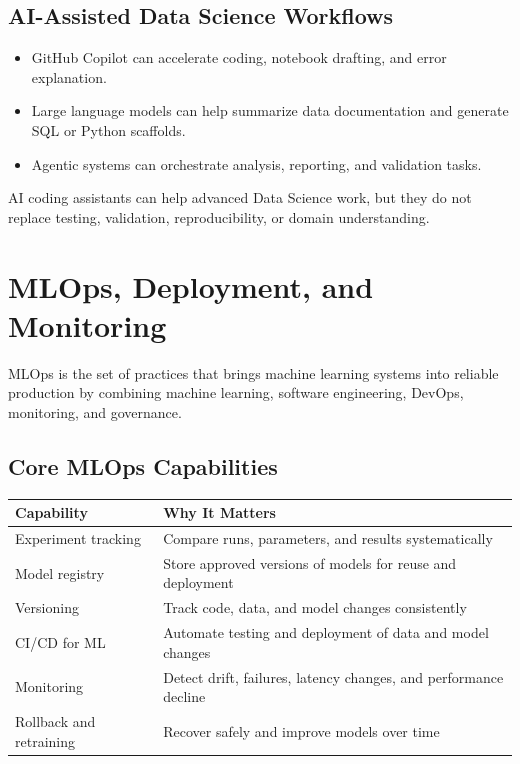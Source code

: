 \documentclass[11pt,a4paper]{article}
\begin{document}
\subsection{AI-Assisted Data Science Workflows}

\begin{itemize}[leftmargin=*]
  \item GitHub Copilot can accelerate coding, notebook drafting, and error explanation.
  \item Large language models can help summarize data documentation and generate SQL or Python scaffolds.
  \item Agentic systems can orchestrate analysis, reporting, and validation tasks.
\end{itemize}

\begin{alertbox}
AI coding assistants can help advanced Data Science work, but they do not replace testing, validation, reproducibility, or domain understanding.
\end{alertbox}

\section{MLOps, Deployment, and Monitoring}

\begin{definitionbox}[MLOps]
MLOps is the set of practices that brings machine learning systems into reliable production by combining machine learning, software engineering, DevOps, monitoring, and governance.
\end{definitionbox}

\subsection{Core MLOps Capabilities}

\begin{longtable}{@{}p{3.2cm}p{9.8cm}@{}}
\toprule
\rowcolor{primary!15}
\textbf{Capability} & \textbf{Why It Matters} \\
\midrule
\endhead
Experiment tracking & Compare runs, parameters, and results systematically \\
\addlinespace
Model registry & Store approved versions of models for reuse and deployment \\
\addlinespace
Versioning & Track code, data, and model changes consistently \\
\addlinespace
CI/CD for ML & Automate testing and deployment of data and model changes \\
\addlinespace
Monitoring & Detect drift, failures, latency changes, and performance decline \\
\addlinespace
Rollback and retraining & Recover safely and improve models over time \\
\bottomrule
\end{longtable}
\end{document}
